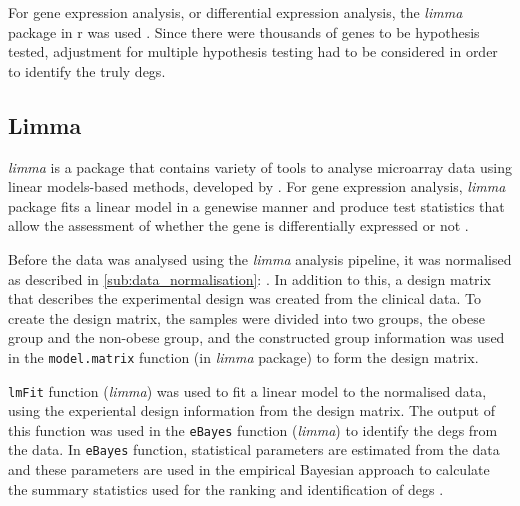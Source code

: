 For gene expression analysis, or differential expression analysis, the \textit{limma} package in \gls{r} was used \citep{Ritchie2015}.
Since there were thousands of genes to be hypothesis tested, adjustment for multiple hypothesis testing had to be considered in order to identify the truly \glspl{deg}.

\subsection{Limma}
\label{sub:limma}

\textit{limma} is a package that contains variety of tools to analyse microarray data using linear models-based methods, developed by \citet{Ritchie2015}.
For gene expression analysis, \textit{limma} package fits a linear model in a genewise manner and produce test statistics that allow the assessment of whether the gene is differentially expressed or not \citep{Ritchie2015}.

Before the data was analysed using the \textit{limma} analysis pipeline, it was normalised as described in \cref{sub:data_normalisation}: .
In addition to this, a design matrix that describes the experimental design was created from the clinical data.
To create the design matrix, the samples were divided into two groups, the obese group and the non-obese group, and the constructed group information was used in the \texttt{model.matrix} function (in \textit{limma} package) to form the design matrix.

\texttt{lmFit} function (\textit{limma}) was used to fit a linear model to the normalised data, using the experiental design information from the design matrix.
The output of this function was used in the \texttt{eBayes} function (\textit{limma}) to identify the \glspl{deg} from the data.
In \texttt{eBayes} function, statistical parameters are estimated from the data and these parameters are used in the empirical Bayesian approach to calculate the summary statistics used for the ranking and identification of \glspl{deg} \citep{Smyth2004}.


